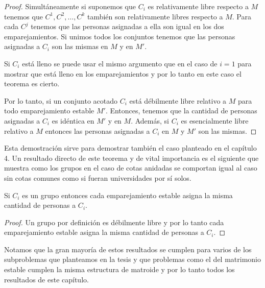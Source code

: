 \begin{proof}
Simultáneamente si suponemos que $C_i$ es relativamente libre respecto a $M$ tenemos que $C^1,C^2,\dots,C^k$ también son relativamente libres respecto a $M$. Para cada $C^j$ tenemos que las personas asignadas a ella son igual en los dos emparejamientos. Si unimos todos los conjuntos tenemos que las personas asignadas a $C_i$ son las mismas en $M$ y en $M'$. 

Si $C_i$ está lleno se puede usar el mismo argumento que en el caso de $i=1$ para mostrar que está lleno en los emparejamientos y por lo tanto en este caso el teorema es cierto. 

Por lo tanto, si un conjunto acotado $C_i$ está débilmente libre relativo a $M$ para todo emparejamiento estable $M'$. Entonces, tenemos que la cantidad de personas asignadas a $C_i$ es idéntica en $M'$ y en $M$. Además, si $C_i$ es esencialmente libre relativo a $M$ entonces las personas asignadas a $C_i$ en $M$ y $M'$ son las mismas. 

\end{proof}

Esta demostración sirve para demostrar también el caso planteado en el capítulo 4. Un resultado directo de este teorema y de vital importancia es el siguiente que muestra como los grupos en el caso de cotas anidadas se comportan igual al caso sin cotas comunes como si fueran universidades por sí solos.

\begin{cor}
Si $C_i$ es un grupo entonces cada emparejamiento estable asigna la misma cantidad de personas a $C_i$.
\end{cor}

\begin{proof}
Un grupo por definición es débilmente libre y por lo tanto cada emparejamiento estable asigna la misma cantidad de personas a $C_i$.
\end{proof}

Notamos que la gran mayoría de estos resultados se cumplen para varios de los subproblemas que planteamos en la tesis y que problemas como el del matrimonio estable cumplen la misma estructura de matroide y por lo tanto todos los resultados de este capítulo.







